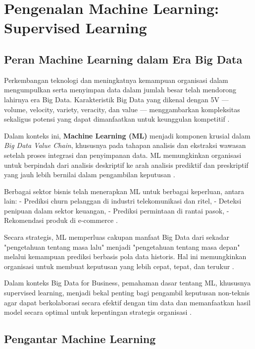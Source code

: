 \chapter{Pengenalan Machine Learning: Supervised Learning}

\section{Peran Machine Learning dalam Era Big Data}

Perkembangan teknologi dan meningkatnya kemampuan organisasi dalam mengumpulkan serta menyimpan data dalam jumlah besar telah mendorong lahirnya era Big Data. Karakteristik Big Data yang dikenal dengan 5V — volume, velocity, variety, veracity, dan value — menggambarkan kompleksitas sekaligus potensi yang dapat dimanfaatkan untuk keunggulan kompetitif \cite{laney2001,gandomi2015,nist2015}.

Dalam konteks ini, \textbf{Machine Learning (ML)} menjadi komponen krusial dalam \textit{Big Data Value Chain}, khususnya pada tahapan analisis dan ekstraksi wawasan setelah proses integrasi dan penyimpanan data. ML memungkinkan organisasi untuk berpindah dari analisis deskriptif ke arah analisis prediktif dan preskriptif yang jauh lebih bernilai dalam pengambilan keputusan \cite{chen2012,wamba2017}.

Berbagai sektor bisnis telah menerapkan ML untuk berbagai keperluan, antara lain:
- Prediksi churn pelanggan di industri telekomunikasi dan ritel,
- Deteksi penipuan dalam sektor keuangan,
- Prediksi permintaan di rantai pasok,
- Rekomendasi produk di e-commerce \cite{mcafee2012,mariani2021,georgescu2020}.

Secara strategis, ML memperluas cakupan manfaat Big Data dari sekadar "pengetahuan tentang masa lalu" menjadi "pengetahuan tentang masa depan" melalui kemampuan prediksi berbasis pola data historis. Hal ini memungkinkan organisasi untuk membuat keputusan yang lebih cepat, tepat, dan terukur \cite{jeble2018,oecd2015,assuncao2015}.

Dalam konteks Big Data for Business, pemahaman dasar tentang ML, khususnya supervised learning, menjadi bekal penting bagi pengambil keputusan non-teknis agar dapat berkolaborasi secara efektif dengan tim data dan memanfaatkan hasil model secara optimal untuk kepentingan strategis organisasi \cite{provost2013data,fernandez2020,davenport2018}.



\section{Pengantar Machine Learning}


